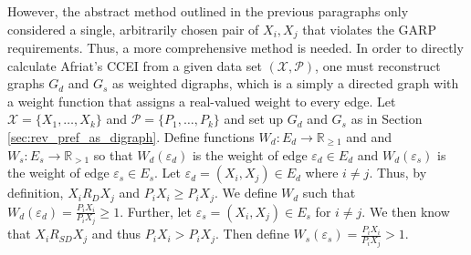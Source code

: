 \documentclass{article} %
\theoremstyle{style1}
\theoremstyle{example}
\begin{document}
However, the abstract method outlined in the previous paragraphs only considered a single, arbitrarily chosen pair of $X_i,X_j$ that violates the GARP requirements. Thus, a more comprehensive method is needed. In order to directly calculate Afriat's CCEI from a given data set $(\mathcal{X},\mathcal{P})$, one must reconstruct graphs $G_d$ and $G_s$ as weighted digraphs, which is a simply a directed graph with a weight function that assigns a real-valued weight to every edge. Let $\mathcal{X}=\{X_1,\ldots,X_k\}$ and $\mathcal{P}=\{P_1,\ldots,P_k\}$ and set up $G_d$ and $G_s$ as in Section \ref{sec:rev_pref_as_digraph}. Define functions $W_d:E_d\to\mathbb{R}_{\geq1}$ and and $W_s:E_s \to\mathbb{R}_{>1}$ so that $W_d(\varepsilon_d)$ is the weight of edge $\varepsilon_d\in E_d$ and $W_d(\varepsilon_s)$ is the weight of edge $\varepsilon_s\in E_s$. Let $\varepsilon_d =(X_i, X_j)\in E_d$ where $i\not=j$. Thus, by definition, $X_i R_D X_j$ and $P_iX_i\geq P_iX_j$. We define $W_d$ such that $W_d(\varepsilon_d)=\frac{P_iX_i}{P_iX_j}\geq 1$. Further, let $\varepsilon_s=(X_i, X_j)\in E_s$ for $i\not=j$. We then know that $X_i R_{SD} X_j$ and thus $P_iX_i>P_iX_j$. Then define $W_s(\varepsilon_s)=\frac{P_iX_i}{P_iX_j}>1$.
\end{document}
